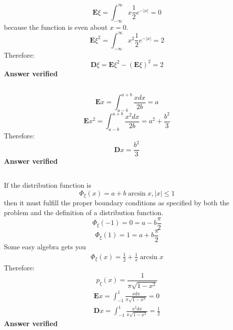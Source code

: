 \subsection{}
\begin{equation}
	\textbf{E}\xi = \int_{-\infty}^{\infty} x\frac{1}{2}e^{-|x|} = 0
\end{equation}
because the function is even about $x=0$.
\begin{equation}
	\textbf{E}\xi^2 = \int_{-\infty}^{\infty} x^2\frac{1}{2}e^{-|x|} = 2
\end{equation}
Therefore:
\begin{equation}
	\textbf{D}\xi = \textbf{E}\xi^2 - (\textbf{E}\xi)^2 = 2
\end{equation}
\textbf{Answer verified}




\subsection{}
\begin{equation}
	\textbf{E}x = \int_{a-b}^{a+b} \frac{xdx}{2b} = a	
\end{equation}
\begin{equation}
	\textbf{E}x^2 = \int_{a-b}^{a+b} \frac{x^2dx}{2b} = a^2+\frac{b^2}{3}
\end{equation}
Therefore:
\begin{equation}
	\textbf{D}x = \frac{b^2}{3}
\end{equation}
\textbf{Answer verified}


\subsection{}
If the distribution function is 
\begin{equation}
	\Phi_{\xi}(x) = a + b \arcsin x, |x| \leq 1
\end{equation}
then it must fulfill the proper boundary conditions as specified by both the problem and the definition of a distribution function.
\begin{equation}
	\Phi_{\xi}(-1)= 0 = a - b \frac{\pi}{2}
\end{equation}
\begin{equation}
	\Phi_{\xi}(1) = 1 = a + b \frac{\pi}{2}
\end{equation}
Some easy algebra gets you
\begin{eqnarray}
	\Phi_{\xi}(x) = \frac{1}{2} + \frac{1}{\pi} \arcsin x
\end{eqnarray}
Therefore:
\begin{equation}
	p_{\xi}(x) = \frac{1}{\pi\sqrt{1-x^2}}
\end{equation}
\begin{eqnarray}
	\textbf{E}x = \int_{-1}^{1} \frac{x dx}{\pi\sqrt{1-x^2}} = 0 \\
	\textbf{D}x = \int_{-1}^{1} \frac{x^2 dx}{\pi\sqrt{1-x^2}} = \frac{1}{2}
\end{eqnarray}
\textbf{Answer verified}



